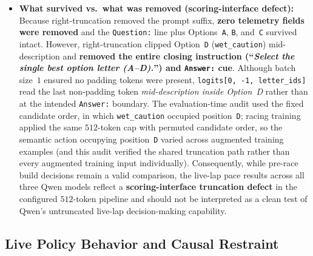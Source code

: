 \documentclass[11pt,a4paper]{article}
\begin{document}
\begin{itemize}[leftmargin=1.5em,itemsep=2pt]
  \item \textbf{What survived vs.\ what was removed (scoring-interface defect):} Because right-truncation removed the prompt suffix, \textbf{zero telemetry fields were removed} and the \texttt{Question:} line plus Options~\texttt{A}, \texttt{B}, and~\texttt{C} survived intact. However, right-truncation clipped Option~\texttt{D} (\texttt{wet\_caution}) mid-description and \textbf{removed the entire closing instruction (``\emph{Select the single best option letter (A--D).}'') and \texttt{Answer:} cue}. Although batch size~$1$ ensured no padding tokens were present, \nolinkurl{logits[0, -1, letter_ids]} read the last non-padding token \emph{mid-description inside Option~D} rather than at the intended \texttt{Answer:} boundary. The evaluation-time audit used the fixed candidate order, in which \texttt{wet\_caution} occupied position~\texttt{D}; racing training applied the same $512$-token cap with permuted candidate order, so the semantic action occupying position~\texttt{D} varied across augmented training examples (and this audit verified the shared truncation path rather than every augmented training input individually). Consequently, while pre-race build decisions remain a valid comparison, the live-lap pace results across all three Qwen models reflect a \textbf{scoring-interface truncation defect} in the configured $512$-token pipeline and should not be interpreted as a clean test of Qwen's untruncated live-lap decision-making capability.
\end{itemize}

\subsection{Live Policy Behavior and Causal Restraint}
\end{document}
